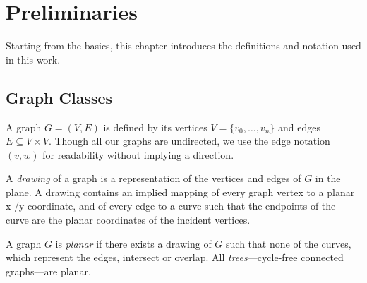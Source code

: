 \chapter{Preliminaries}
\label{ch:preliminaries}

Starting from the basics, this chapter introduces the definitions and notation used in this work.

\section{Graph Classes}

A graph $G = (V, E)$ is defined by its vertices $V = \{ v_0, \ldots , v_n \}$ and edges $E \subseteq V \times V$. Though all our graphs are undirected, we use the edge notation $(v, w)$ for readability without implying a direction.

A \emph{drawing} of a graph is a representation of the vertices and edges of $G$ in the plane. A drawing contains an implied mapping of every graph vertex to a planar x-/y-coordinate, and of every edge to a curve such that the endpoints of the curve are the planar coordinates of the incident vertices.

A graph $G$ is \emph{planar} if there exists a drawing of $G$ such that none of the curves, which represent the edges, intersect or overlap. All \emph{trees}---cycle-free connected graphs---are planar.

